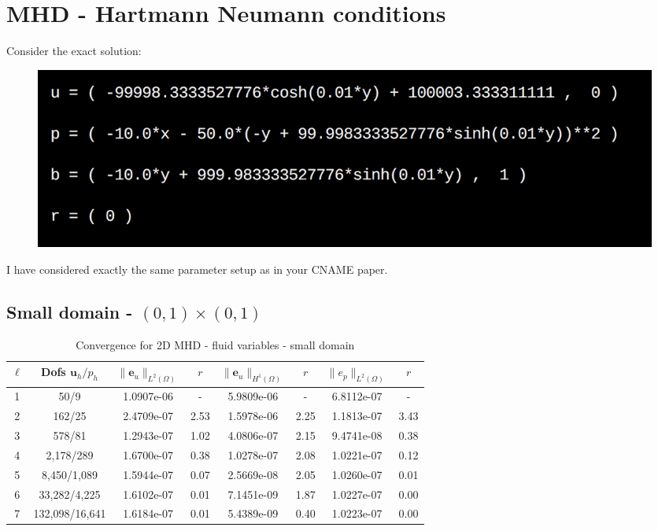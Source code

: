 \documentclass{article}
\newcommand{\uu}[1]{\boldsymbol #1}
\begin{document}
\newpage

\section*{MHD - Hartmann Neumann conditions}


Consider the exact solution:
\begin{figure}[h!]
    \centering
    \includegraphics[width=\textwidth]{HartmannSol}
\end{figure}
I have considered exactly the same parameter setup as in your CNAME paper.


\subsection*{Small domain - $(0,1)\times(0,1)$}
\begin{table}[h!]
\begin{center}
\begin{tabular}{cccccccc}
\hline \hline

$\ell$ &    Dofs $\uu{u}_h/p_h$ & $\|\uu{e}_u\|_{L^2(\Omega)}$ & $r$ & $\|\uu{e}_u\|_{H^1(\Omega)}$ & $r$ &$\|e_p\|_{L^2(\Omega)}$ & $r$  \\
\hline
\hline
1 &      50/9 &  1.0907e-06 &     - &  5.9809e-06 &     - &  6.8112e-07 &      - \\
2 &     162/25 &  2.4709e-07 &     2.53 &  1.5978e-06 &     2.25 &  1.1813e-07 &      3.43 \\
3 &     578/81 &  1.2943e-07 &     1.02 &  4.0806e-07 &     2.15 &  9.4741e-08 &      0.38 \\
4 &    2,178/289 &  1.6700e-07 &     0.38 &  1.0278e-07 &     2.08 &  1.0221e-07 &      0.12 \\
5 &    8,450/1,089 &  1.5944e-07 &     0.07 &  2.5669e-08 &     2.05 &  1.0260e-07 &      0.01 \\
6 &   33,282/4,225 &  1.6102e-07 &     0.01 &  7.1451e-09 &     1.87 &  1.0227e-07 &      0.00 \\
7 &  132,098/16,641 &  1.6184e-07 &     0.01 &  5.4389e-09 &     0.40 &  1.0223e-07 &      0.00 \\
\hline\hline
\end{tabular}

\caption{Convergence for 2D MHD - fluid variables - small domain}
\label{tab:MHD_2D_smooth_fluids_velocity}
\end{center}
\end{table}
\end{document}
